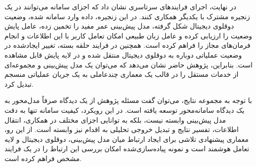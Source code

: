 در نهایت، اجرای فرایندهای سرتاسری نشان داد که اجزای سامانه می‌توانند در یک زنجیره مشترک با یکدیگر همکاری کنند. در این زنجیره، داده وارد سامانه شده، وضعیت دوقلوی دیجیتال شکل گرفته، مدل پیش‌بینی عمر مفید را تخمین زده، عامل پایش وضعیت را ارزیابی کرده و عامل زبان طبیعی امکان تعامل کاربر با این اطلاعات و انجام فرمان‌های مجاز را فراهم کرده است. همچنین در فرایند حلقه بسته، تغییر ایجادشده در وضعیت عملیاتی دوباره به دوقلوی دیجیتال منتقل شده و در لایه پایش قابل مشاهده است. بنابراین، پژوهش حاضر نشان می‌دهد که می‌توان یک مدل پیش‌بینی و مجموعه‌ای از خدمات مستقل را در قالب یک معماری چندعاملی به یک جریان عملیاتی منسجم تبدیل کرد.

با توجه به مجموعه نتایج، می‌توان گفت مسئله پژوهش از یک دیدگاه صرفاً مدل‌محور به یک دیدگاه سامانه‌محور توسعه یافته است. در این رویکرد، کیفیت سامانه تنها به دقت مدل پیش‌بینی وابسته نیست، بلکه به توانایی اجزای مختلف در همکاری، انتقال اطلاعات، تفسیر نتایج و تبدیل خروجی تحلیلی به اقدام نیز وابسته است. از این رو، معماری پیشنهادی تلاشی برای ایجاد ارتباط میان مدل پیش‌بینی، دوقلوی دیجیتال و لایه تعامل هوشمند است و نمونه پیاده‌سازی‌شده امکان بررسی این ارتباط را در یک فرایند مشخص فراهم کرده است.



